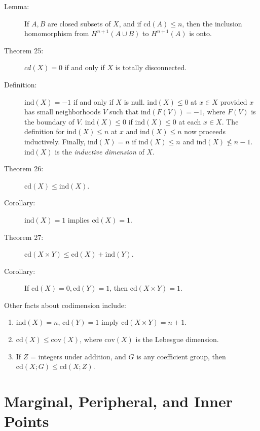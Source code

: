 \documentclass{article}
\begin{document}
\begin{description}
\item[Lemma:] If $A,B$ are closed subsets of $X$, and if $\text{cd}(A) \leq n$, then the inclusion homomorphism from $H^{n+1}(A \cup B)$ to $H^{n+1}(A)$ is onto.

\item[Theorem 25:] $cd(X)=0$ if and only if $X$ is totally disconnected.

\item[Definition:] $\text{ind}(X)=-1$ if and only if $X$ is null. $\text{ind}(X)\leq 0$ at $x \in X$ provided $x$ has small neighborhoods $V$ such that $\text{ind}(F(V))=-1$, where $F(V)$ is the boundary of $V$. $\text{ind}(X) \leq 0$ if $\text{ind}(X) \leq 0$ at each $x \in X$. The definition for $\text{ind}(X) \leq n$ at $x$ and $\text{ind}(X) \leq n$ now proceeds inductively. Finally, $\text{ind}(X)=n$ if $\text{ind}(X) \leq n$ and $\text{ind}(X) \not \leq n-1$. $\text{ind}(X)$ is the \emph{inductive dimension} of $X$.

\item[Theorem 26:] $\text{cd}(X) \leq \text{ind}(X)$.

\item[Corollary:] $\text{ind}(X)=1$ implies $\text{cd}(X)=1$.

\item[Theorem 27:] $\text{cd}(X \times Y) \leq \text{cd}(X) + \text{ind}(Y)$.

\item[Corollary:] If $\text{cd}(X)=0, \text{cd}(Y)=1$, then $\text{cd}(X \times Y)=1$.

\end{description}

Other facts about codimension include:
\begin{enumerate}[\hspace{1cm}(1)]
  \item $\text{ind}(X)=n$, $\text{cd}(Y)=1$ imply $\text{cd}(X \times Y)=n+1$.
  \item $\text{cd}(X) \leq \text{cov}(X)$, where $\text{cov}(X)$ is the Lebesgue dimension. 
  \item If $Z$ = integers under addition, and $G$ is any coefficient group, then $\text{cd}(X;G) \leq \text{cd}(X;Z)$.
\end{enumerate}



\section{Marginal, Peripheral, and Inner Points}
\end{document}
